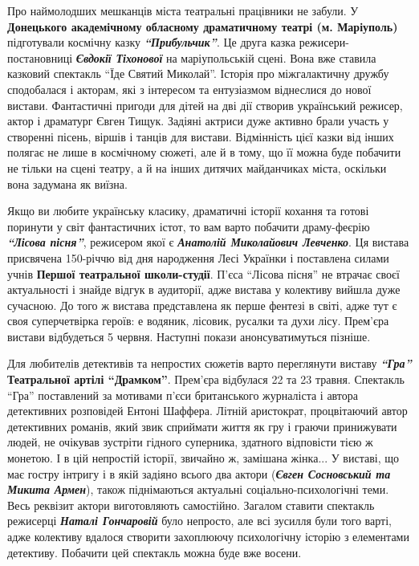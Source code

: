 Про наймолодших мешканців міста театральні працівники не забули. У \textbf{Донецького
академічному обласному драматичному театрі (м. Маріуполь)} підготували космічну
казку \emph{\textbf{\enquote{Прибульчик}}}. Це друга казка режисери-постановниці \emph{\textbf{Євдокії Тіхонової}} на
маріупольській сцені. Вона вже ставила казковий спектакль \enquote{Їде Святий Миколай}.
Історія про міжгалактичну дружбу сподобалася і акторам, які з інтересом та
ентузіазмом віднеслися до нової вистави. Фантастичні пригоди для дітей на дві
дії створив український режисер, актор і драматург Євген Тищук. Задіяні актриси
дуже активно брали участь у створенні пісень, віршів і танців для вистави.
Відмінність цієї казки від інших полягає не лише в космічному сюжеті, але й в
тому, що її  можна буде побачити не тільки на сцені театру, а й на інших
дитячих майданчиках міста, оскільки вона задумана як виїзна. 


Якщо ви любите українську класику, драматичні історії кохання та готові
поринути у світ фантастичних істот, то вам варто побачити драму-феєрію \textbf{\emph{\enquote{Лісова
пісня}}}, режисером якої є \emph{\textbf{Анатолій Миколайович Левченко}}. Ця вистава присвячена
150-річчю від дня народження Лесі Українки і поставлена силами учнів \textbf{Першої
театральної школи-студії}. П'єса \enquote{Лісова пісня} не втрачає своєї актуальності і
знайде відгук в аудиторії, адже вистава у колективу вийшла дуже сучасною. До
того ж вистава представлена як перше фентезі в світі, адже тут є своя
суперчетвірка героїв: е водяник, лісовик, русалки та духи лісу. Прем'єра
вистави відбудеться 5 червня. Наступні покази анонсуватимуться пізніше.


Для любителів детективів та непростих сюжетів варто переглянути виставу \textbf{\emph{\enquote{Гра}}}
\textbf{Театральної артілі \enquote{Драмком}}. Прем'єра відбулася 22 та 23 травня. Спектакль
\enquote{Гра} поставлений за мотивами п'єси британського журналіста і автора
детективних розповідей Ентоні Шаффера. Літній аристократ, процвітаючий автор
детективних романів, який звик сприймати життя як гру і граючи принижувати
людей, не очікував зустріти гідного суперника, здатного відповісти тією ж
монетою. І в цій непростій історії, звичайно ж, замішана жінка... У виставі,
що має гостру інтригу і в якій задіяно всього два актори (\emph{\textbf{Євген Сосновський та
Микита Армен}}), також піднімаються актуальні соціально-психологічні теми. Весь
реквізит актори виготовляють самостійно. Загалом ставити спектакль режисерці
\emph{\textbf{Наталі Гончаровій}} було непросто, але всі зусилля були того варті, адже
колективу вдалося створити захоплюючу психологічну історію з елементами
детективу. Побачити цей спектакль можна буде вже восени.

